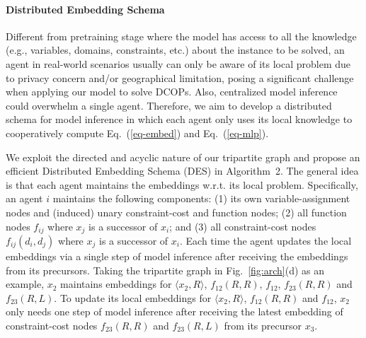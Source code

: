 \documentclass[letterpaper]{article} %
\begin{document}
\paragraph{Distributed Embedding Schema}
Different from pretraining stage where the model has access to all the knowledge (e.g., variables, domains, constraints, etc.) about the instance to be solved, an agent in real-world scenarios usually can only be aware of its local problem due to privacy concern and/or geographical limitation, posing a significant challenge when applying our model to solve DCOPs. Also, centralized model inference could overwhelm a single agent. Therefore, we aim to develop a distributed schema for model inference in which each agent only uses its local knowledge to cooperatively compute Eq.~(\ref{eq-embed}) and Eq.~(\ref{eq-mlp}).


We
exploit the directed and acyclic nature of our tripartite graph and propose an efficient Distributed Embedding Schema (DES) in Algorithm~2. The general idea is that each agent maintains the embeddings w.r.t. its local problem. Specifically, an agent $i$ maintains the following components: (1) its own variable-assignment nodes and (induced) unary constraint-cost and function nodes; (2) all function nodes $f_{ij}$ where $x_j$ is a successor of $x_i$; and (3) all constraint-cost nodes $f_{ij}(d_i,d_j)$ where $x_j$ is a successor of $x_i$. Each time the agent updates the local embeddings via a single step of model inference after receiving the embeddings from its precursors. Taking the tripartite graph in Fig.~\ref{fig:arch}(d) as an example, $x_2$ maintains embeddings for $\langle x_2,R\rangle$, $f_{12}(R,R)$, $f_{12}$, $f_{23}(R,R)$ and $f_{23}(R,L)$. To update its local embeddings for $\langle x_2,R\rangle$, $f_{12}(R,R)$ and $f_{12}$, $x_2$ only needs one step of model inference after receiving the latest embedding of constraint-cost nodes $f_{23}(R,R)$ and $f_{23}(R,L)$ from its precursor $x_3$. 
\end{document}
